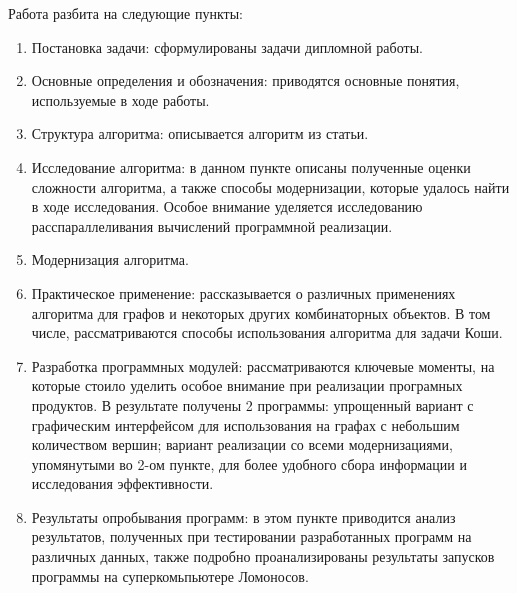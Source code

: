 Работа разбита на следующие пункты:
\begin{enumerate}
\item Постановка задачи: сформулированы задачи дипломной работы.
\item Основные определения и обозначения: приводятся основные понятия, используемые в ходе работы.
\item Структура алгоритма: описывается алгоритм из статьи.
\item Исследование алгоритма: в данном пункте описаны полученные оценки сложности алгоритма, а также способы модернизации, которые удалось найти в ходе исследования. Особое внимание уделяется исследованию расспараллеливания вычислений программной реализации.
\item Модернизация алгоритма.
\item Практическое применение: рассказывается о различных применениях алгоритма для графов и некоторых других комбинаторных объектов. В том числе, рассматриваются способы использования алгоритма для задачи Коши.
\item Разработка программных модулей: рассматриваются ключевые моменты, на которые стоило уделить особое внимание при реализации програмных продуктов. В результате получены 2 программы: упрощенный вариант с графическим интерфейсом для использования на графах с небольшим количеством вершин; вариант реализации со всеми модернизациями, упомянутыми во 2-ом пункте, для более удобного сбора информации и исследования эффективности.
\item Результаты опробывания программ: в этом пункте приводится анализ результатов, полученных при тестировании разработанных программ на различных данных, также подробно проанализированы результаты запусков программы на суперкомьпьютере Ломоносов.
\end{enumerate}
